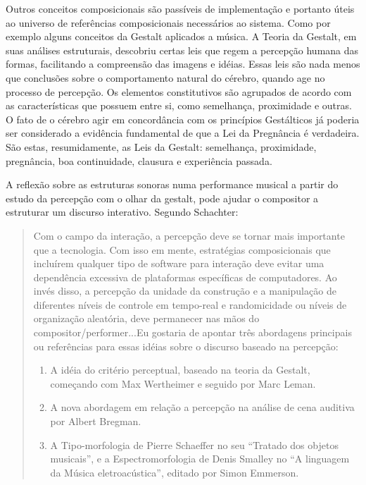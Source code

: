 \documentclass{ppgmus}
\begin{document}
Outros conceitos composicionais são passíveis de implementação e portanto úteis 
ao universo de referências composicionais necessários ao sistema. Como por exemplo 
alguns conceitos da Gestalt aplicados a música. A Teoria da Gestalt, em suas análises estruturais, 
descobriu certas leis que regem a
percepção humana das formas, facilitando a compreensão das imagens e idéias. Essas leis são
nada menos que conclusões sobre o comportamento natural do cérebro, quando age no
processo de percepção. Os elementos constitutivos são agrupados de acordo com as
características que possuem entre si, como semelhança, proximidade e outras. O fato de o cérebro agir 
em concordância com os princípios Gestálticos já poderia ser
considerado a evidência fundamental de que a Lei da Pregnância é verdadeira. São estas,
resumidamente, as Leis da Gestalt: semelhança, proximidade, pregnância, boa continuidade, clausura e 
experiência passada.

A reflexão sobre as estruturas sonoras numa performance musical a partir do estudo
da percepção com o olhar da gestalt, pode ajudar o compositor a estruturar um 
discurso interativo. Segundo Schachter:
\begin{quote}
 Com o campo da interação, a percepção deve se tornar mais importante que a tecnologia.
Com isso em mente, estratégias composicionais que incluírem qualquer tipo de software
 para interação deve evitar uma dependência excessiva de plataformas específicas de 
computadores. Ao invés disso, a percepção da unidade da construção e a manipulação de
diferentes níveis de controle em tempo-real e randomicidade ou níveis de organização
aleatória, deve permanecer nas mãos do compositor/performer...Eu gostaria de apontar
três abordagens principais ou referências para essas idéias sobre o discurso baseado
na percepção:
\begin{enumerate}
 \item A idéia do critério perceptual, baseado na teoria da Gestalt, começando com
Max Wertheimer e seguido por Marc Leman.
  \item A nova abordagem em relação a percepção na análise de cena auditiva por Albert
Bregman.
  \item A Tipo-morfologia de Pierre Schaeffer no seu ``Tratado dos objetos musicais'',
e a Espectromorfologia de Denis Smalley no ``A linguagem da Música eletroacústica'', editado
por Simon Emmerson.
\cite{schachter07:discourse}
\end{enumerate}
\end{quote} 
\end{document}
